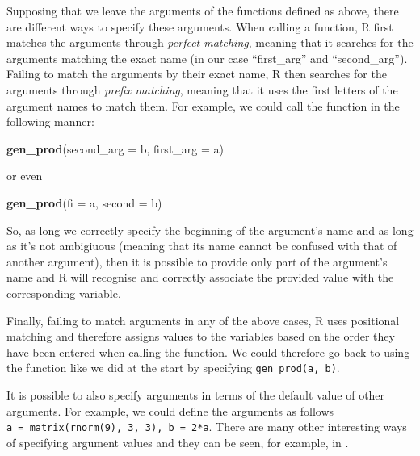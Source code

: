 \documentclass[12pt,]{krantz}
\newenvironment{Shaded}{\begin{snugshade}}{\end{snugshade}}
\newcommand{\KeywordTok}[1]{\textcolor[rgb]{0.27,0.27,0.27}{\textbf{#1}}}
\newcommand{\DataTypeTok}[1]{\textcolor[rgb]{0.27,0.27,0.27}{#1}}
\newcommand{\NormalTok}[1]{#1}
\let\BeginKnitrBlock\begin \let\EndKnitrBlock\end
\begin{document}
Supposing that we leave the arguments of the functions defined as above,
there are different ways to specify these arguments. When calling a
function, R first matches the arguments through \emph{perfect matching},
meaning that it searches for the arguments matching the exact name (in
our case ``first\_arg'' and ``second\_arg''). Failing to match the
arguments by their exact name, R then searches for the arguments through
\emph{prefix matching}, meaning that it uses the first letters of the
argument names to match them. For example, we could call the function in
the following manner:

\begin{Shaded}
\begin{Highlighting}[]
\KeywordTok{gen_prod}\NormalTok{(}\DataTypeTok{second_arg =}\NormalTok{ b, }\DataTypeTok{first_arg =}\NormalTok{ a)}
\end{Highlighting}
\end{Shaded}

or even

\begin{Shaded}
\begin{Highlighting}[]
\KeywordTok{gen_prod}\NormalTok{(}\DataTypeTok{fi =}\NormalTok{ a, }\DataTypeTok{second =}\NormalTok{ b)}
\end{Highlighting}
\end{Shaded}

So, as long we correctly specify the beginning of the argument's name
and as long as it's not ambigiuous (meaning that its name cannot be
confused with that of another argument), then it is possible to provide
only part of the argument's name and R will recognise and correctly
associate the provided value with the corresponding variable.

Finally, failing to match arguments in any of the above cases, R uses
positional matching and therefore assigns values to the variables based
on the order they have been entered when calling the function. We could
therefore go back to using the function like we did at the start by
specifying \texttt{gen\_prod(a,\ b)}.

\BeginKnitrBlock{rmdnote}
It is possible to also specify arguments in terms of the default value
of other arguments. For example, we could define the arguments as
follows \texttt{a\ =\ matrix(rnorm(9),\ 3,\ 3),\ b\ =\ 2*a}. There are
many other interesting ways of specifying argument values and they can
be seen, for example, in \citet{wickham2014advanced} .
\EndKnitrBlock{rmdnote}
\end{document}
